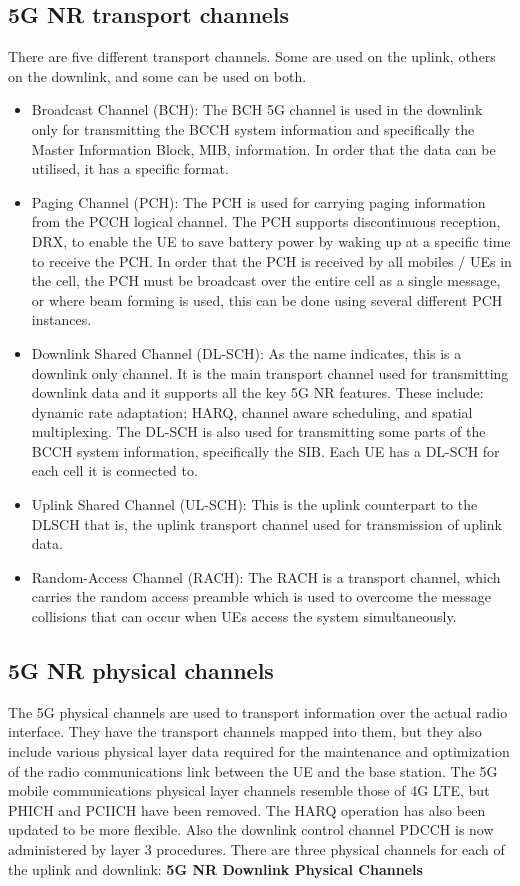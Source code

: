 \subsection{5G NR transport channels}
There are five different transport channels. Some are used on the uplink, others on the downlink, and some can be used on both.

\begin{itemize}
    \item Broadcast Channel (BCH): The BCH 5G channel is used in the downlink only for transmitting the BCCH system information and specifically the Master Information Block, MIB, information. In order that the data can be utilised, it has a specific format.
    \item Paging Channel (PCH): The PCH is used for carrying paging information from the PCCH logical channel. The PCH supports discontinuous reception, DRX, to enable the UE to save battery power by waking up at a specific time to receive the PCH.
    \newline
    In order that the PCH is received by all mobiles / UEs in the cell, the PCH must be broadcast over the entire cell as a single message, or where beam forming is used, this can be done using several different PCH instances.
    \item Downlink Shared Channel (DL-SCH): As the name indicates, this is a downlink only channel. It is the main transport channel used for transmitting downlink data and it supports all the key 5G NR features. These include: dynamic rate adaptation; HARQ, channel aware scheduling, and spatial multiplexing.
    \newline
    The DL-SCH is also used for transmitting some parts of the BCCH system information, specifically the SIB. Each UE has a DL-SCH for each cell it is connected to.
    \item Uplink Shared Channel (UL-SCH): This is the uplink counterpart to the DLSCH that is, the uplink transport channel used for transmission of uplink data.
    \item Random-Access Channel (RACH): The RACH is a transport channel, which carries the random access preamble which is used to overcome the message collisions that can occur when UEs access the system simultaneously.
\end{itemize}

\subsection{5G NR physical channels}
The 5G physical channels are used to transport information over the actual radio interface. They have the transport channels mapped into them, but they also include various physical layer data required for the maintenance and optimization of the radio communications link between the UE and the base station.
The 5G mobile communications physical layer channels resemble those of 4G LTE, but PHICH and PCIICH have been removed. The HARQ operation has also been updated to be more flexible. Also the downlink control channel PDCCH is now administered by layer 3 procedures.
There are three physical channels for each of the uplink and downlink:
\newline
\textbf{5G NR Downlink Physical Channels}

